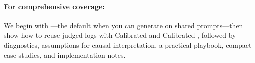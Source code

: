 \paragraph{For comprehensive coverage:} We begin with \dm---the default when you can generate on shared prompts---then show how to reuse judged logs with Calibrated \ips{} and Calibrated \dr, followed by diagnostics, assumptions for causal interpretation, a practical playbook, compact case studies, and implementation notes.
